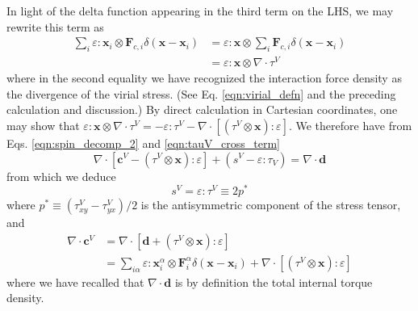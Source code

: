 \documentclass[%
 reprint,
superscriptaddress,
longbibliography,
 amsmath,amssymb,
 prl,
 citeautoscript,
]{revtex4-1}
\begin{document}
In light of the delta function appearing in the third term on the LHS, we may rewrite this term as
\begin{equation}
\begin{split}
\sum_i \varepsilon : {\boldsymbol x}_i \otimes {\boldsymbol F}_{c,i} \delta \left( {\boldsymbol x} - {\boldsymbol x}_i \right) &= \varepsilon : {\boldsymbol x} \otimes \sum_i {\boldsymbol F}_{c,i} \delta \left( {\boldsymbol x} - {\boldsymbol x}_i \right) \\
&= \varepsilon : {\boldsymbol x} \otimes \nabla \cdot \tau^V
\end{split}
\label{eqn:tauV_cross_term}
\end{equation}
where in the second equality we have recognized the interaction force density as the divergence of the virial stress. (See Eq. \ref{eqn:virial_defn} and the preceding calculation and discussion.) By direct calculation in Cartesian coordinates, one may show that $\varepsilon : {\boldsymbol x} \otimes \nabla \cdot \tau^V = - \varepsilon : \tau^V - \nabla \cdot \left[ \left( \tau^V \otimes {\boldsymbol x} \right) : \varepsilon \right]$. We therefore have from Eqs. \ref{eqn:spin_decomp_2} and \ref{eqn:tauV_cross_term}
\begin{equation}
\nabla \cdot \left[ {\boldsymbol c}^V - \left( \tau^V \otimes {\boldsymbol x} \right) : \varepsilon \right] + \left( s^V - \varepsilon : \tau_V \right) = \nabla \cdot {\boldsymbol d}
\label{eqn:term_balance_couple_stress}
\end{equation}
from which we deduce
\begin{equation}
s^V = \varepsilon : \tau^V \equiv 2 p^*
\label{eqn:source_term_spin_eqn}
\end{equation}
where $p^* \equiv \left( \tau^V_{xy} - \tau^V_{yx} \right)/2$ is the antisymmetric component of the stress tensor, and
\begin{equation}
\begin{split}
\nabla \cdot {\boldsymbol c}^V &= \nabla \cdot \left[ {\boldsymbol d} + \left( \tau^V \otimes {\boldsymbol x} \right) : \varepsilon \right] \\
&= \sum_{i\alpha} \varepsilon : {\boldsymbol x}_i^{\alpha} \otimes {\boldsymbol F}_i^{\alpha} \delta \left( {\boldsymbol x} - {\boldsymbol x}_i \right) + \nabla \cdot \left[ \left( \tau^V \otimes {\boldsymbol x} \right) : \varepsilon \right]
\end{split}
\label{eqn:couple_stress_divergence}
\end{equation}
where we have recalled that $\nabla \cdot {\boldsymbol d}$ is by definition the total internal torque density.
\end{document}

